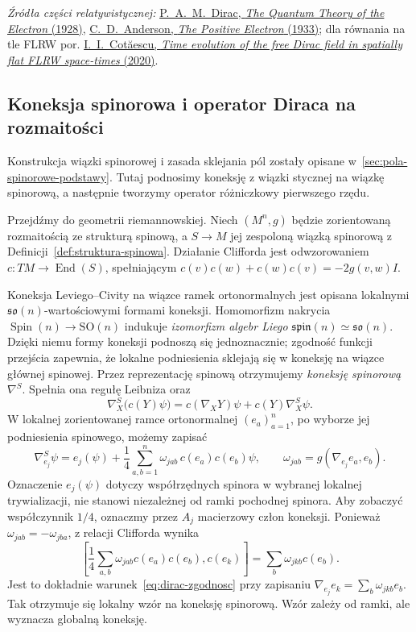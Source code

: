 \par\smallskip
{\footnotesize\noindent\emph{Źródła części relatywistycznej:}
\href{https://doi.org/10.1098/rspa.1928.0023}
{P.~A.~M.~Dirac, \emph{The Quantum Theory of the Electron} (1928)},
\href{https://doi.org/10.1103/PhysRev.43.491}
{C.~D.~Anderson, \emph{The Positive Electron} (1933)};
dla równania na tle FLRW por.
\href{https://arxiv.org/abs/2005.00831}
{I.~I.~Cot\u{a}escu, \emph{Time evolution of the free Dirac field in
spatially flat FLRW space-times} (2020)}.\par}

\subsection{Koneksja spinorowa i operator Diraca na rozmaitości}
\label{subsec:dirac-koneksja}

Konstrukcja wiązki spinorowej i zasada sklejania pól
zostały opisane w~\ref{sec:pola-spinorowe-podstawy}.
Tutaj podnosimy koneksję z wiązki stycznej na
wiązkę spinorową, a następnie tworzymy operator
różniczkowy pierwszego rzędu.

Przejdźmy do geometrii riemannowskiej. Niech $(M^n,g)$
będzie zorientowaną rozmaitością ze strukturą spinową,
a $S\to M$ jej zespoloną wiązką spinorową z
Definicji~\ref{def:struktura-spinowa}.
Działanie Clifforda jest odwzorowaniem
$c:TM\to\operatorname{End}(S)$, spełniającym
$c(v)c(w)+c(w)c(v)=-2g(v,w)I$.

Koneksja Leviego--Civity na wiązce ramek ortonormalnych
jest opisana lokalnymi $\mathfrak{so}(n)$-wartościowymi
formami koneksji. Homomorfizm nakrycia
$\operatorname{Spin}(n)\to\mathrm{SO}(n)$ indukuje
\emph{izomorfizm algebr Liego} $\mathfrak{spin}(n)
\simeq\mathfrak{so}(n)$. Dzięki niemu formy koneksji
podnoszą się jednoznacznie; zgodność funkcji przejścia
zapewnia, że lokalne podniesienia sklejają się w koneksję
na wiązce głównej spinowej. Przez reprezentację spinową
otrzymujemy \emph{koneksję spinorową} $\nabla^S$.
Spełnia ona regułę Leibniza oraz
\begin{equation}\label{eq:dirac-zgodnosc}
 \nabla^S_X\bigl(c(Y)\psi\bigr)
 =c(\nabla_XY)\psi+c(Y)\nabla^S_X\psi.
\end{equation}
W lokalnej zorientowanej ramce ortonormalnej
$(e_a)_{a=1}^n$, po wyborze jej podniesienia spinowego,
możemy zapisać
\begin{equation}\label{eq:dirac-koneksja-lokalna}
 \nabla^S_{e_j}\psi
 =e_j(\psi)+\frac14\sum_{a,b=1}^n
 \omega_{jab}\,c(e_a)c(e_b)\psi,
 \qquad
 \omega_{jab}=g(\nabla_{e_j}e_a,e_b).
\end{equation}
Oznaczenie $e_j(\psi)$ dotyczy współrzędnych spinora
w wybranej lokalnej trywializacji, nie stanowi
niezależnej od ramki pochodnej spinora.
Aby zobaczyć współczynnik $1/4$, oznaczmy przez $A_j$
macierzowy człon koneksji. Ponieważ
$\omega_{jab}=-\omega_{jba}$, z relacji Clifforda
wynika
\[
 \left[\frac14\sum_{a,b}\omega_{jab}c(e_a)c(e_b),
 c(e_k)\right]=\sum_b\omega_{jkb}c(e_b).
\]
Jest to dokładnie warunek~\eqref{eq:dirac-zgodnosc}
przy zapisaniu $\nabla_{e_j}e_k=\sum_b\omega_{jkb}e_b$.
Tak otrzymuje się lokalny wzór na koneksję spinorową.
Wzór zależy od ramki, ale wyznacza globalną koneksję.

